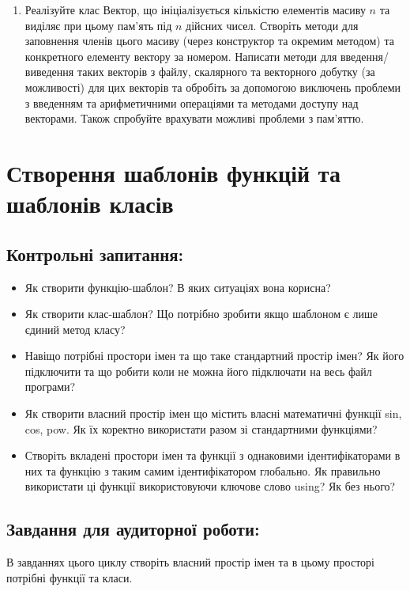 \documentclass[a5paper,titlepage,openany,twoside,
]
{book_unv}%
\begin{document}
\begin{enumerate}
\begin{enumerate}
\begin{enumerate}
\item

Реалізуйте клас Вектор, що ініціалізується кількістю елементів масиву $n$
  та виділяє при цьому пам'ять під $n$ дійсних чисел. Створіть методи для
  заповнення членів цього масиву (через конструктор та окремим методом)
  та конкретного елементу вектору за номером. 
  Написати методи для введення/виведення таких векторів з файлу,
  скалярного та векторного добутку (за можливості) для цих векторів та обробіть
  за допомогою виключень проблеми з введенням та арифметичними операціями та методами 
 доступу над векторами. Також спробуйте врахувати можливі проблеми з пам'яттю.
 
\end{enumerate}


\chapter{Створення шаблонів функцій та шаблонів класів}
%

\section{Контрольні запитання:}
\begin{itemize}
\item
Як створити функцію-шаблон? В яких ситуаціях вона корисна?
\item
Як створити клас-шаблон? Що потрібно зробити якщо шаблоном є лише
єдиний метод класу?
\item
  Навіщо потрібні простори імен та що таке стандартний простір імен? Як
  його підключити та що робити коли не можна його підключати на весь
  файл програми?
\item
  Як створити власний простір імен що містить власні математичні функції
  sin, cos, pow. Як їх коректно використати разом зі стандартними
  функціями?
\item
  Створіть вкладені простори імен та функції з однаковими
  ідентифікаторами в них та функцію з таким самим ідентифікатором
  глобально. Як правильно використати ці функції використовуючи ключове
  слово using? Як без нього?
\end{itemize}

\section{Завдання для аудиторної роботи:}
В завданнях цього циклу створіть власний простір імен та в цьому просторі
потрібні функції та класи.  


\end{enumerate}
\end{enumerate}
\end{document}
